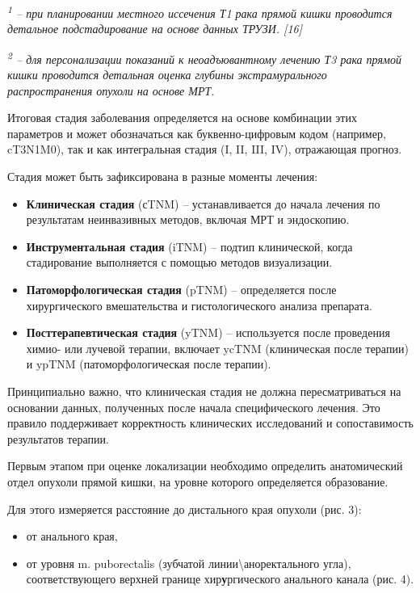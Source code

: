 \documentclass[
  russian,
  12pt,
  a4paper,
]{report}
\begin{document}
\emph{\textsuperscript{1} -- при планировании местного иссечения Т1 рака
прямой кишки проводится детальное подстадирование на основе данных
ТРУЗИ. {[}16{]}}

\emph{\textsuperscript{2} -- для персонализации показаний к
неоадъювантному лечению Т3 рака прямой кишки проводится детальная оценка
глубины экстрамурального распространения опухоли на основе МРТ.}

Итоговая стадия заболевания определяется на основе комбинации этих
параметров и может обозначаться как буквенно-цифровым кодом (например,
cT3N1M0), так и как интегральная стадия (I, II, III, IV), отражающая
прогноз.

Стадия может быть зафиксирована в разные моменты лечения:

\begin{itemize}
\item
  \textbf{Клиническая стадия} (сTNM) -- устанавливается до начала
  лечения по результатам неинвазивных методов, включая МРТ и эндоскопию.
\item
  \textbf{Инструментальная стадия} (iTNM) -- подтип клинической, когда
  стадирование выполняется с помощью методов визуализации.
\item
  \textbf{Патоморфологическая стадия} (pTNM) -- определяется после
  хирургического вмешательства и гистологического анализа препарата.
\item
  \textbf{Посттерапевтическая стадия} (yTNM) -- используется после
  проведения химио- или лучевой терапии, включает ycTNM (клиническая
  после терапии) и ypTNM (патоморфологическая после терапии).
\end{itemize}

Принципиально важно, что клиническая стадия не должна пересматриваться
на основании данных, полученных после начала специфического лечения. Это
правило поддерживает корректность клинических исследований и
сопоставимость результатов терапии.

Первым этапом при оценке локализации необходимо определить анатомический
отдел опухоли прямой кишки, на уровне которого определяется образование.

Для этого измеряется расстояние до дистального края опухоли (рис. 3):

\begin{itemize}
\item
  от анального края,
\item
  от уровня m. puborectalis (зубчатой линии\textbackslash аноректального
  угла), соответствующего верхней границе хир\textbf{у}ргического
  анального канала (рис. 4).
\end{itemize}
\end{document}
